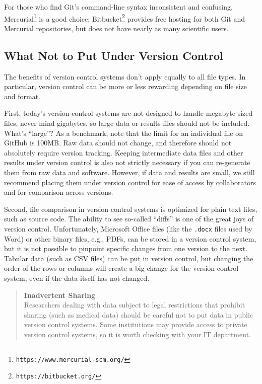 \documentclass[10pt,letterpaper]{article}
\newcommand{\withurl}[2]{{#1}\footnote{{\texttt{#2}}}}
\begin{document}
For those who find Git's command-line syntax inconsistent
and confusing, \withurl{Mercurial}{https://www.mercurial-scm.org/} is
a good choice; \withurl{Bitbucket}{https://bitbucket.org/} provides
free hosting for both Git and Mercurial repositories, but does not
have nearly as many scientific users.

\subsection*{What Not to Put Under Version Control}

The benefits of version control systems don't apply equally to all file types.
In particular, version control can be more or less rewarding depending on file
size and format.

First, today's version control systems are not designed to handle
megabyte-sized files, never mind gigabytes, so large data or
results files should not be included. What's ``large''? As a benchmark, note that
the limit for an individual file on GitHub is 100MB. Raw data should not change,
and therefore should not absolutely require version tracking. Keeping
intermediate data files and other results under version control is also not
strictly necessary if you can re-generate them from raw data and
software. However, if data and results are small, we still recommend
placing them under version control for ease of access by collaborators
and for comparison across versions.

Second, file comparison in version control systems is optimized
for plain text files, such as source code. The ability to see so-called
``diffs'' is one of the great joys of version control. Unfortunately,
Microsoft Office files (like the \texttt{.docx} files used by Word) or other
binary files, e.g.,  PDFs, can be stored in a version control system,
but it is not possible to pinpoint specific changes from one version to the next.
Tabular data (such as CSV files) can be put in version control, but changing
the order of the rows or columns will create a big change for the version
control system, even if the data itself has not changed.

\begin{quote}
  \noindent \textbf{Inadvertent Sharing}
  \\
  Researchers dealing with data subject to legal restrictions that
  prohibit sharing (such as medical data) should be careful not to put
  data in public version control systems. Some institutions may
  provide access to private version control systems, so it is worth
  checking with your IT department.
\end{quote}
\end{document}
